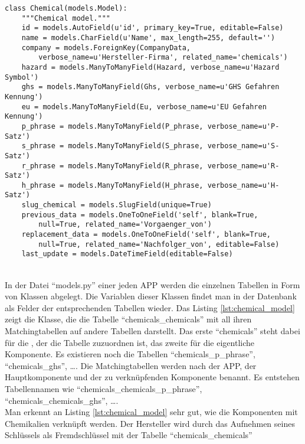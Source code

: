 \begin{lstlisting}[caption={Ausschnitt aus der
Datei "`models.py"' der chemicals-APP, die in der Datenbank durch die Tabelle
"`chemicals\_chemicals"' und allen dazugehörigen Matchingtabellen dargestellt
wird }, label=lst:chemical_model,captionpos=b]
class Chemical(models.Model):
    """Chemical model."""
    id = models.AutoField(u'id', primary_key=True, editable=False)
    name = models.CharField(u'Name', max_length=255, default='')
    company = models.ForeignKey(CompanyData,
        verbose_name=u'Hersteller-Firma', related_name='chemicals')
    hazard = models.ManyToManyField(Hazard, verbose_name=u'Hazard Symbol')
    ghs = models.ManyToManyField(Ghs, verbose_name=u'GHS Gefahren Kennung')
    eu = models.ManyToManyField(Eu, verbose_name=u'EU Gefahren Kennung')
    p_phrase = models.ManyToManyField(P_phrase, verbose_name=u'P-Satz')
    s_phrase = models.ManyToManyField(S_phrase, verbose_name=u'S-Satz')
    r_phrase = models.ManyToManyField(R_phrase, verbose_name=u'R-Satz')
    h_phrase = models.ManyToManyField(H_phrase, verbose_name=u'H-Satz')
    slug_chemical = models.SlugField(unique=True)
    previous_data = models.OneToOneField('self', blank=True,
        null=True, related_name='Vorgaenger_von')
    replacement_data = models.OneToOneField('self', blank=True,
        null=True, related_name='Nachfolger_von', editable=False)
    last_update = models.DateTimeField(editable=False)
\end{lstlisting}
\\
In der Datei "`models.py"' einer jeden \ac{APP} werden die einzelnen Tabellen in
Form von Klassen abgelegt. Die Variablen dieser Klassen findet man in der
Datenbank als Felder der entsprechenden Tabellen wieder. Das Listing
\ref{lst:chemical_model} zeigt die Klasse, die die Tabelle
"`chemicals\_chemicals"' mit all ihren Matchingtabellen auf andere Tabellen darstellt. Das erste "`chemicals"' steht dabei
für die , der die Tabelle zuzuordnen ist, das zweite für die
eigentliche Komponente. Es existieren noch die Tabellen "`chemicals\_p\_phrase"',
"`chemicals\_ghs"', \ldots. Die Matchingtabellen werden nach der \ac{APP}, der
Hauptkomponente und der zu verknüpfenden Komponente benannt. Es entstehen
Tabellennamen wie "`chemicals\_chemicals\_p\_phrase"',
"`chemicals\_chemicals\_ghs"', \ldots.
\\
Man erkennt an Listing \ref{lst:chemical_model} sehr gut, wie die Komponenten
mit Chemikalien verknüpft werden. Der Hersteller wird durch das Aufnehmen
seines Schlüssels als Fremdschlüssel mit der Tabelle "`chemicals\_chemicals"'
